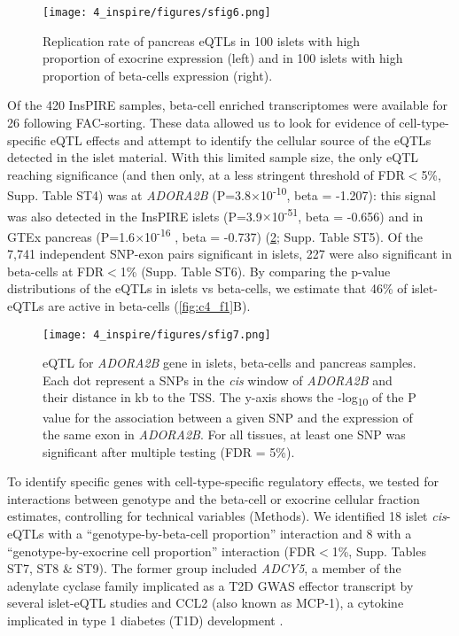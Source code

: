\begin{figure}
    \centering
    \texttt{[image: 4\_inspire/figures/sfig6.png]}
    \caption[Replication rate of pancreas eQTLs in 100 islets]{Replication rate of pancreas eQTLs in 100 islets with high proportion of exocrine expression (left) and in 100 islets with high proportion of beta-cells expression (right).}
    \label{fig:c4_sf6}
  \end{figure}
  
Of the 420 InsPIRE samples, beta-cell enriched transcriptomes were available for 26 following FAC-sorting. These data allowed us to look for evidence of cell-type-specific eQTL effects and attempt to identify the cellular source of the eQTLs detected in the islet material. With this limited sample size, the only eQTL reaching significance (and then only, at a less stringent threshold of FDR$<$5\%, Supp. Table ST4) was at \textit{ADORA2B} (P=3.8$\times$10\textsuperscript{-10}, beta = -1.207): this signal was also detected in the InsPIRE islets (P=3.9$\times$10\textsuperscript{-51}, beta = -0.656) and in GTEx pancreas (P=1.6$\times$10\textsuperscript{-16} , beta = -0.737) (\ref{fig:c4_sf_adora2b}; Supp. Table ST5). Of the 7,741 independent SNP-exon pairs significant in islets, 227 were also significant in beta-cells at FDR$<$1\% (Supp. Table ST6). By comparing the p-value distributions of the eQTLs in islets vs beta-cells, we estimate that 46\% of islet-eQTLs are active in beta-cells (\ref{fig:c4_f1}B). 

\begin{figure}
    \centering
    \texttt{[image: 4\_inspire/figures/sfig7.png]}
    \caption[eQTL for \textit{ADORA2B} gene in islets, beta-cells and pancreas samples]{eQTL for \textit{ADORA2B} gene in islets, beta-cells and pancreas samples. Each dot represent a SNPs in the \textit{cis} window of \textit{ADORA2B} and their distance in kb to the TSS. The y-axis shows the -log\textsubscript{10} of the P value for the association between a given SNP and the expression of the same exon in \textit{ADORA2B}. For all tissues, at least one SNP was significant after multiple testing (FDR = 5\%). }
    \label{fig:c4_sf_adora2b}
 \end{figure}
  
To identify specific genes with cell-type-specific regulatory effects, we tested for interactions between genotype and the beta-cell or exocrine cellular fraction estimates, controlling for technical variables (Methods). We identified 18 islet \textit{cis}-eQTLs with a “genotype-by-beta-cell proportion” interaction and 8 with a “genotype-by-exocrine cell proportion” interaction (FDR$<$1\%, Supp. Tables ST7, ST8 \& ST9). The former group included \textit{ADCY5}, a member of the adenylate cyclase family implicated as a T2D GWAS effector transcript by several islet-eQTL studies \cite{varshneyGeneticRegulatorySignatures2017, romanTypeDiabetesAssociated2017} and CCL2 (also known as MCP-1), a cytokine implicated in type 1 diabetes (T1D) development \cite{kriegelPancreaticIsletExpression2012}. 


